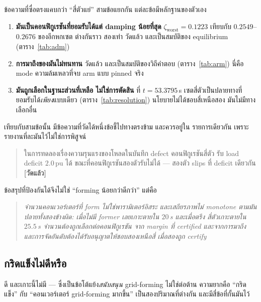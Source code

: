 \documentclass[12pt,a4paper]{article}
\theoremstyle{remark}
\newcommand{\pu}{\,\mathrm{pu}}
\newcommand{\zworst}{\zeta_{\mathrm{worst}}}
\newcommand{\measured}{\textcolor{ok}{\textbf{[วัดแล้ว]}}}
\begin{document}
ข้อความที่ซื่อตรงแคบกว่า ``สี่ตัวแย่'' สามข้อแยกกัน แต่ละข้อมีหลักฐานของตัวเอง

\begin{enumerate}[leftmargin=1.9em]
\item \textbf{มันเป็นคอนฟิกูเรชันที่ยอมรับได้แต่ damping น้อยที่สุด}
      $\zworst = 0.1223$ เทียบกับ $0.2549$--$0.2676$ ของอีกหกเซต ต่างกันราว
      สองเท่า วัดแล้ว และเป็นสมบัติของ equilibrium (ตาราง~\ref{tab:adm})
\item \textbf{การมาถึงของมันไม่ทนทาน} วัดแล้ว และเป็นสมบัติของวิถีคำตอบ
      (ตาราง~\ref{tab:arm}) นี่คือ mode ความล้มเหลวที่จบ arm แบบ pinned จริง
\item \textbf{มันถูกเลือกในฐานะส่วนที่เหลือ ไม่ใช่การตัดสิน} ที่ $t = 53.3795$\,s
      เซตสี่ตัวเป็นปลายทางที่ยอมรับได้\emph{เพียง}แบบเดียว
      (ตาราง~\ref{tab:resolution}) นโยบายไม่ได้ชอบสี่เหนือสอง มันไม่มีทางเลือกอื่น
\end{enumerate}

เทียบกับสามข้อนั้น มีข้อความที่วัดได้หนึ่งข้อชี้ไปทางตรงข้าม และควรอยู่ใน
รายการเดียวกัน เพราะรายงานที่ละมันไว้ไม่ใช่การพิสูจน์

\begin{quote}
ในการทดลองเรื่องความรุนแรงของโหลดในบันทึก defect คอนฟิกูเรชันสี่ตัว
รับ load deficit $2.0\pu$ ได้ ขณะที่คอนฟิกูเรชันสองตัวรับไม่ได้ ---
สองตัว slips ที่ deficit เดียวกัน \measured
\end{quote}

ข้อสรุปที่ป้องกันได้จึงไม่ใช่ ``forming น้อยกว่าดีกว่า'' แต่คือ

\begin{quote}\itshape
จำนวนคอนเวอร์เตอร์ที่ form ไม่ใช่พารามิเตอร์อิสระ และเสถียรภาพไม่ monotone
ตามมัน ปลายทั้งสองข้างผิด: เมื่อไม่มี former เลยเกาะตายใน $20$\,s และเมื่อตรึง
สี่ตัวเกาะตายใน $25.5$\,s จำนวนต้องถูกเลือกต่อคอนฟิกูเรชัน จาก margin ที่
certified และจากการมาถึง และการจัดอันดับต้องได้รับอนุญาตให้ชอบสองเหนือสี่
เมื่อสองถูก certify
\end{quote}

\subsection{กริดแข็งไม่ดีหรือ}\label{sec:stronggrid}

ดี และเกาะนี้ไม่มี --- ซึ่งเป็นข้อโต้แย้ง\emph{สนับสนุน} grid-forming
ไม่ใช่ต่อต้าน ความยากคือ ``กริดแข็ง'' กับ ``คอนเวอร์เตอร์ grid-forming มากขึ้น''
เป็นสองปริมาณที่ต่างกัน และมีสี่ข้อที่กั้นมันไว้
\end{document}
